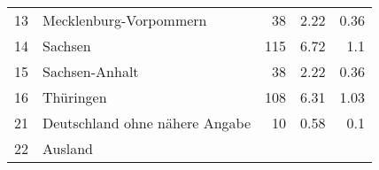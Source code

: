 \begin{longtable}{lXrrr}
     13 &
     \multicolumn{1}{X}{ Mecklenburg-Vorpommern   } &


       \num{38} &
       \num[round-mode=places,round-precision=2]{2,22} &
         \num[round-mode=places,round-precision=2]{0,36} \\

     14 &
     \multicolumn{1}{X}{ Sachsen   } &


       \num{115} &
       \num[round-mode=places,round-precision=2]{6,72} &
         \num[round-mode=places,round-precision=2]{1,1} \\

     15 &
     \multicolumn{1}{X}{ Sachsen-Anhalt   } &


       \num{38} &
       \num[round-mode=places,round-precision=2]{2,22} &
         \num[round-mode=places,round-precision=2]{0,36} \\

     16 &
     \multicolumn{1}{X}{ Thüringen   } &


       \num{108} &
       \num[round-mode=places,round-precision=2]{6,31} &
         \num[round-mode=places,round-precision=2]{1,03} \\

     21 &
     \multicolumn{1}{X}{ Deutschland ohne nähere Angabe   } &


       \num{10} &
       \num[round-mode=places,round-precision=2]{0,58} &
         \num[round-mode=places,round-precision=2]{0,1} \\

     22 &
     \multicolumn{1}{X}{ Ausland   } &



\end{longtable}
